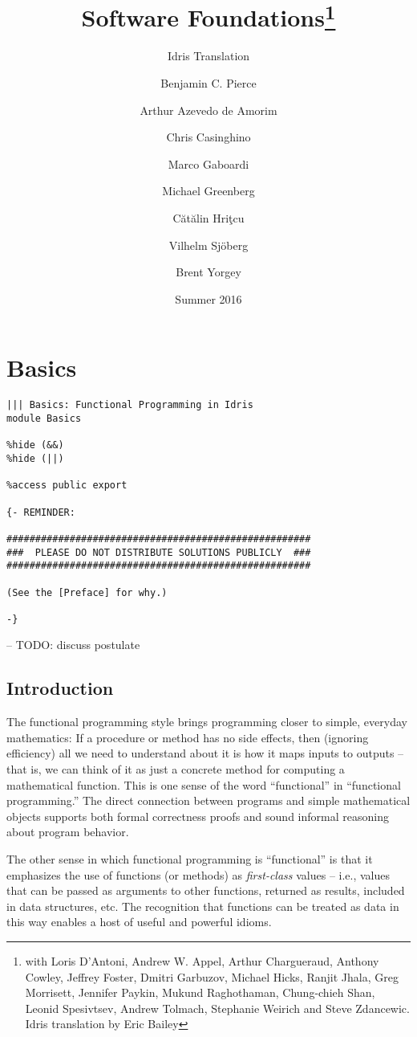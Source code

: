 \documentclass[b5paper,twoside]{amsbook}
\title{Software Foundations\thanks{with Loris D'Antoni, Andrew W. Appel, Arthur Chargueraud, Anthony
Cowley, Jeffrey Foster, Dmitri Garbuzov, Michael Hicks, Ranjit Jhala,
Greg Morrisett, Jennifer Paykin, Mukund Raghothaman, Chung-chieh Shan,
Leonid Spesivtsev, Andrew Tolmach, Stephanie Weirich and Steve
Zdancewic. Idris translation by Eric Bailey}}
\subtitle{Idris Translation}
\author{Benjamin C. Pierce \and Arthur Azevedo de Amorim \and Chris Casinghino \and Marco Gaboardi \and Michael Greenberg \and Cătălin Hriţcu \and Vilhelm Sjöberg \and Brent Yorgey}
\date{Summer 2016}
\begin{document}
\maketitle

\frontmatter

{
\setcounter{tocdepth}{3}
\tableofcontents
}
\mainmatter

\section{Basics}\label{basics}

\begin{verbatim}
||| Basics: Functional Programming in Idris
module Basics

%hide (&&)
%hide (||)

%access public export

{- REMINDER:

#####################################################
###  PLEASE DO NOT DISTRIBUTE SOLUTIONS PUBLICLY  ###
#####################################################

(See the [Preface] for why.)

-}
\end{verbatim}

-- TODO: discuss postulate

\subsection{Introduction}\label{introduction}

The functional programming style brings programming closer to simple,
everyday mathematics: If a procedure or method has no side effects, then
(ignoring efficiency) all we need to understand about it is how it maps
inputs to outputs -- that is, we can think of it as just a concrete
method for computing a mathematical function. This is one sense of the
word ``functional'' in ``functional programming.'' The direct connection
between programs and simple mathematical objects supports both formal
correctness proofs and sound informal reasoning about program behavior.

The other sense in which functional programming is ``functional'' is
that it emphasizes the use of functions (or methods) as
\emph{first-class} values -- i.e., values that can be passed as
arguments to other functions, returned as results, included in data
structures, etc. The recognition that functions can be treated as data
in this way enables a host of useful and powerful idioms.
\end{document}
